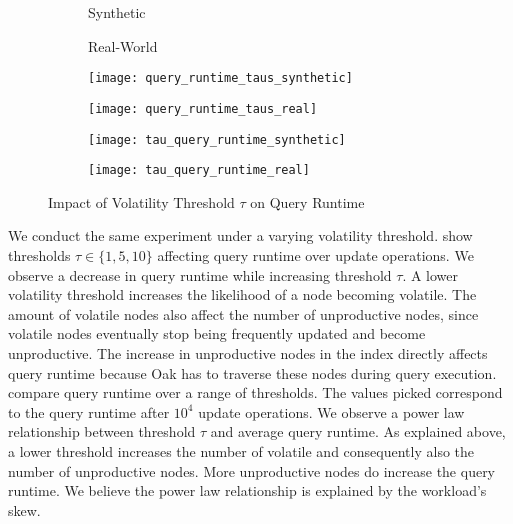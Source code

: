 \documentclass[abstracton,12pt]{scrartcl}
\theoremstyle{definition}
\begin{document}
\begin{figure}[h]
  \centering
  \begin{subfigure}{0.49\linewidth}
    \centering
    Synthetic
  \end{subfigure}
  \begin{subfigure}{0.49\linewidth}
    \centering
    Real-World
  \end{subfigure}
  \begin{subfigure}{0.49\linewidth}
    \centering
    \texttt{[image: query\_runtime\_taus\_synthetic]}
    \caption{}
    \label{fig:query_runtime_taus_synthetic}
  \end{subfigure}
  \begin{subfigure}{0.49\linewidth}
    \centering
    \texttt{[image: query\_runtime\_taus\_real]}
    \caption{}
    \label{fig:query_runtime_taus_real}
  \end{subfigure}
  \begin{subfigure}{0.49\linewidth}
    \centering
    \texttt{[image: tau\_query\_runtime\_synthetic]}
    \caption{}
    \label{fig:tau_query_runtime_synthetic}
  \end{subfigure}
  \begin{subfigure}{0.49\linewidth}
    \centering
    \texttt{[image: tau\_query\_runtime\_real]}
    \caption{}
    \label{fig:tau_query_runtime_real}
  \end{subfigure}
\caption{Impact of Volatility Threshold $\tau$ on Query Runtime}
\end{figure}

We conduct the same experiment under a varying volatility threshold. 
 show
thresholds $\tau \in \{1,5,10\}$ affecting query runtime
over update operations. We observe a decrease in query runtime
while increasing threshold $\tau$.
A lower volatility threshold increases the likelihood of a node
becoming volatile. The amount of volatile nodes also affect the number of
unproductive nodes, since volatile nodes eventually stop being frequently
updated and become unproductive. The increase in unproductive nodes in the index
directly affects query runtime because Oak has to traverse these nodes during
query execution.
 compare query
runtime over a range of thresholds. The values picked correspond to
the query runtime after $10^4$ update operations.
We observe a power law relationship between threshold $\tau$ and average query
runtime. As explained above, a lower threshold increases the number of volatile
and consequently also the number of unproductive nodes. More unproductive nodes
do increase the query runtime. We believe the power law relationship is
explained by the workload's skew. 
\end{document}
